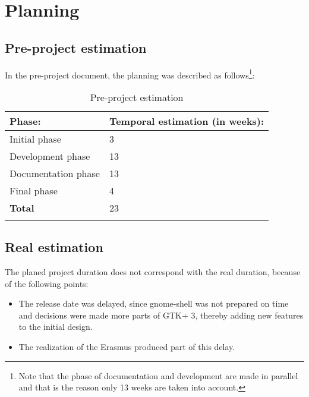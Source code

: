 \chapter{Planning}

\section{Pre-project estimation}

In the pre-project document,  the planning was described as follows\footnote{Note that the phase of documentation and development are made in parallel and that is the reason only 13 weeks are taken into account.}:

\begin{table}[H]
  \begin{center}
    \begin{tabularx}{0.60\textwidth}{|X|X|}
      \firsthline
      \textbf{Phase:} & \textbf{Temporal estimation (in weeks):} \\
      \hline
      Initial phase & 3 \\
      \hline
      Development phase & 13 \\
      \hline
      Documentation phase & 13 \\
      \hline
      Final phase & 4 \\
      \hline
      \textbf{Total} & 23 \\
      \lasthline
    \end{tabularx}
    \caption{Pre-project estimation}
  \end{center}
\end{table}

\newpage
{}

\newpage
{}

\newpage
\section{Real estimation}

The planed project duration does not correspond with the real duration, because of the following points:
\begin{itemize}
  \item The \GNOME release date was delayed, since gnome-shell was not prepared on time and decisions were made 
    more parts of GTK+ 3, thereby adding new features to the initial design.
  \item The realization of the Erasmus produced part of this delay.
\end{itemize}

